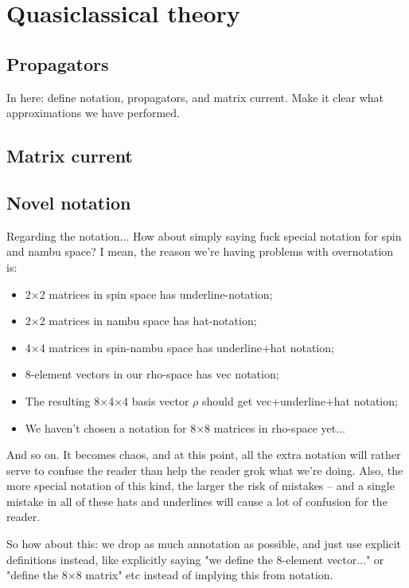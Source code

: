 \chapter{Quasiclassical theory}
\section{Propagators}
In here: define notation, propagators, and matrix current.
Make it clear what approximations we have performed.
\section{Matrix current}

\section{Novel notation}
Regarding the notation... How about simply saying fuck special notation for spin and nambu space? I mean, the reason we're having problems with overnotation is:
\begin{itemize}
  \item 2×2 matrices in spin space has underline-notation;
  \item 2×2 matrices in nambu space has hat-notation;
  \item 4×4 matrices in spin-nambu space has underline+hat notation;
  \item 8-element vectors in our rho-space has vec notation;
  \item The resulting 8×4×4 basis vector $\rho$ should get vec+underline+hat notation;
  \item We haven't chosen a notation for 8×8 matrices in rho-space yet...
\end{itemize}
And so on. It becomes chaos, and at this point, all the extra notation will rather serve to confuse the reader than help the reader grok what we're doing. Also,
the more special notation of this kind, the larger the risk of mistakes -- and a single mistake in all of these hats and underlines will cause a lot of confusion for the reader.

So how about this: we drop as much annotation as possible, and just use explicit definitions instead, like explicitly saying "we define the 8-element vector..." or "define the 8×8 matrix" etc instead of implying this from notation.

